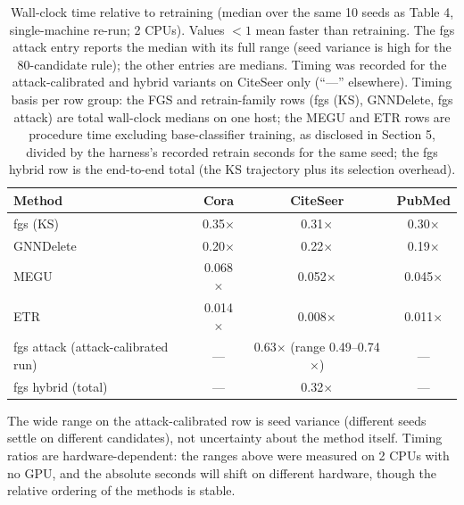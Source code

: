 \documentclass[pdflatex,sn-basic,Numbered]{sn-jnl}
\begin{document}
\begin{table}[htbp]\centering\small
\caption{Wall-clock time relative to retraining (median over the same 10 seeds as Table 4, single-machine re-run; 2 CPUs). Values $< 1$ mean faster than retraining. The fgs attack entry reports the median with its full range (seed variance is high for the 80-candidate rule); the other entries are medians. Timing was recorded for the attack-calibrated and hybrid variants on CiteSeer only (``---'' elsewhere). Timing basis per row group: the FGS and retrain-family rows (fgs (KS), GNNDelete, fgs attack) are total wall-clock medians on one host; the MEGU and ETR rows are procedure time excluding base-classifier training, as disclosed in Section 5, divided by the harness's recorded retrain seconds for the same seed; the fgs hybrid row is the end-to-end total (the KS trajectory plus its selection overhead).}
\begin{tabular}{lccc}\toprule Method & Cora & CiteSeer & PubMed\\\midrule
fgs (KS) & 0.35$\times$ & 0.31$\times$ & 0.30$\times$\\
GNNDelete & 0.20$\times$ & 0.22$\times$ & 0.19$\times$\\
MEGU & 0.068$\times$ & 0.052$\times$ & 0.045$\times$\\
ETR & 0.014$\times$ & 0.008$\times$ & 0.011$\times$\\
fgs attack (attack-calibrated run) & --- & 0.63$\times$ (range 0.49--0.74$\times$) & ---\\
fgs hybrid (total) & --- & 0.32$\times$ & ---\\\bottomrule
\end{tabular}\end{table}

The wide range on the attack-calibrated row is seed variance (different seeds settle on different candidates), not uncertainty about the method itself. Timing ratios are hardware-dependent: the ranges above were measured on 2 CPUs with no GPU, and the absolute seconds will shift on different hardware, though the relative ordering of the methods is stable.
\end{document}
